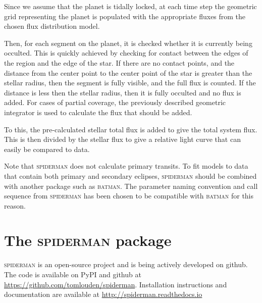 \documentclass[a4paper,fleqn,usenatbib]{mnras}
\begin{document}
Since we assume that the planet is tidally locked, at each time step the geometric grid representing the planet is populated with the appropriate fluxes from the chosen flux distribution model.

Then, for each segment on the planet, it is checked whether it is currently being occulted. This is quickly achieved by checking for contact between the edges of the region and the edge of the star. If there are no contact points, and the distance from the center point to the center point of the star is greater than the stellar radius, then the segment is fully visible, and the full flux is counted. If the distance is less then the stellar radius, then it is fully occulted and no flux is added. For cases of partial coverage, the previously described geometric integrator is used to calculate the flux that should be added.

To this, the pre-calculated stellar total flux is added to give the total system flux. This is then divided by the stellar flux to give a relative light curve that can easily be compared to data.

Note that \textsc{spiderman} does not calculate primary transits. To fit models to data that contain both primary and secondary eclipses, \textsc{spiderman} should be combined with another package such as \textsc{batman}. The parameter naming convention and call sequence from \textsc{spiderman} has been chosen to be compatible with \textsc{batman} for this reason. 

\section{The \textsc{spiderman} package}\label{sec:package}

\textsc{spiderman} is an open-source project and is being actively developed on github. The code is available on PyPI and github at \url{https://github.com/tomlouden/spiderman}. 
Installation instructions and documentation are available at \url{http://spiderman.readthedocs.io}



\end{document}
